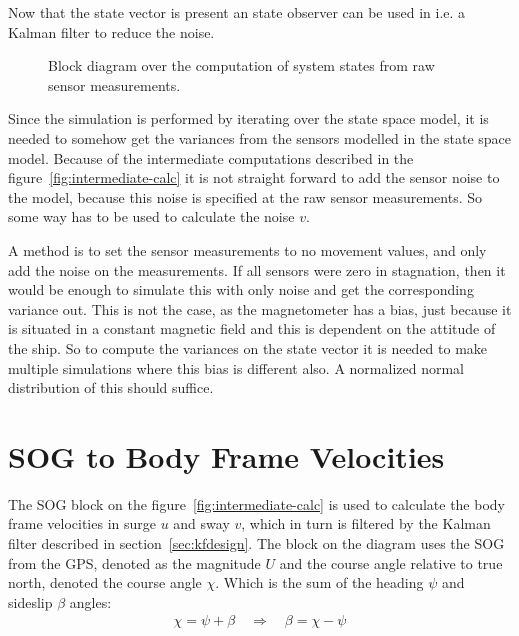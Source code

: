 Now that the state vector is present an state observer can be used
in i.e. a Kalman filter to reduce the noise.

\begin{figure}
	\centering
	
	\caption{Block diagram over the computation of system states from
	raw sensor measurements.}
	\label{fig:intermediate-calc}
\end{figure}

Since the simulation is performed by iterating over the state space
model, it is needed to somehow get the variances from the sensors
modelled in the state space model. Because of the intermediate
computations described in the figure~\vref{fig:intermediate-calc} it
is not straight forward to add the sensor noise to the model, because
this noise is specified at the raw sensor measurements. So some way
has to be used to calculate the noise $v$.

A method is to set the sensor measurements to no movement values, and
only add the noise on the measurements. If all sensors were zero in
stagnation, then it would be enough to simulate this with only noise and
get the corresponding variance out. This is not the case, as the
magnetometer has a bias, just because it is situated in a constant
magnetic field and this is dependent on the attitude of the ship. So
to compute the variances on the state vector it is needed to make
multiple simulations where this bias is different also. A normalized
normal distribution of this should suffice. 

\section{\acs{SOG} to Body Frame Velocities}
The \acl{SOG} block on the figure~\vref{fig:intermediate-calc} is used to calculate the body frame velocities in surge $u$ and sway $v$, which in turn is filtered by the Kalman filter described in section~\vref{sec:kfdesign}. The block on the diagram uses the \ac{SOG} from the \ac{GPS}, denoted as the magnitude $U$ and the course angle relative to true north, denoted the course angle $\chi$. Which is the sum of the heading $\psi$ and sideslip $\beta$ angles:
\begin{align}
\chi = \psi + \beta \quad \Rightarrow  \quad \beta = \chi - \psi
\label{eq:angles}
\end{align}

